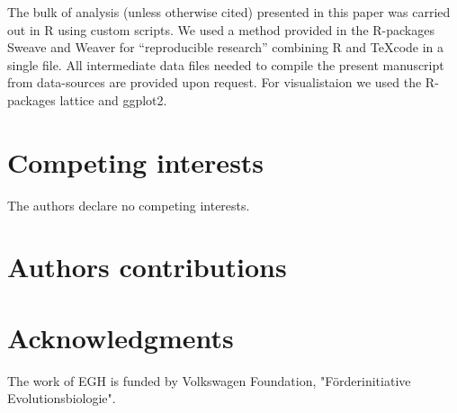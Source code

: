 \documentclass[10pt]{bmc_article}
\newenvironment{bmcformat}{\begin{raggedright}\baselineskip20pt\sloppy\setboolean{publ}{false}}{\end{raggedright}\baselineskip20pt\sloppy}
\begin{document}
\begin{bmcformat}
The bulk of analysis (unless otherwise cited) presented in this paper
was carried out in R \cite{R_project} using custom scripts. We used a
method provided in the R-packages
Sweave\cite{lmucs-papers:Leisch:2002} and Weaver\cite{weaver} for
``reproducible research'' combining R and \TeX code in a single
file. All intermediate data files needed to compile the present
manuscript from data-sources are provided upon request. For
visualistaion we used the R-packages lattice\cite{lattice-book} and
ggplot2\cite{ggplot-book}.


\section*{Competing interests}
The authors declare no competing interests.

\section*{Authors contributions}

\section*{Acknowledgments}

The work of EGH is funded by
Volkswagen Foundation, "F\"{o}rderinitiative Evolutionsbiologie".
 

{
  
} %


\end{bmcformat}
\end{document}
